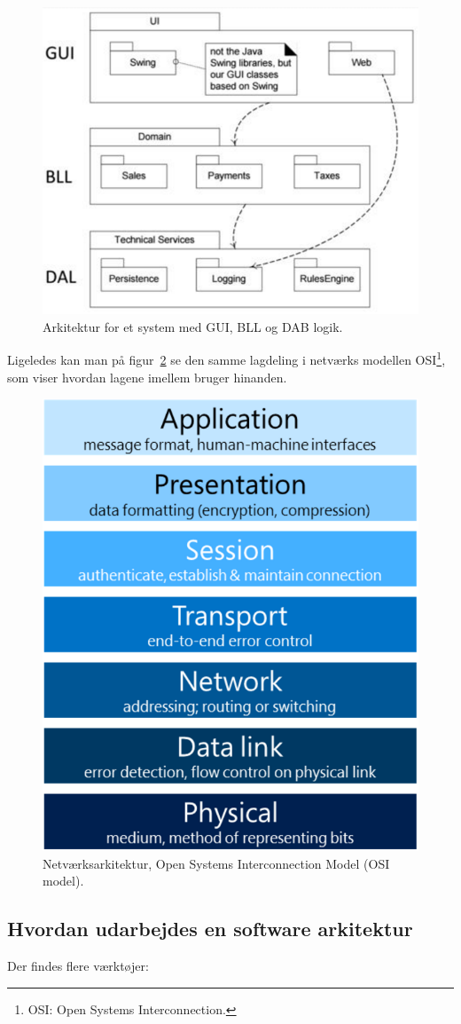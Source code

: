 \begin{figure}[h]
	\centering
	\includegraphics[width=0.7\linewidth]{figs/guiblldal}
	\caption{Arkitektur for et system med GUI, BLL og DAB logik.}
	\label{fig:guiblldab}
\end{figure}

Ligeledes kan man på figur~\ref{fig:osimodel} se den samme lagdeling i netværks modellen OSI\footnote{OSI: Open Systems Interconnection.}, som viser hvordan lagene imellem bruger hinanden.

\begin{figure}[h]
	\centering
	\includegraphics[width=0.5\linewidth]{figs/osimodel}
	\caption{Netværksarkitektur, Open Systems Interconnection Model (OSI model).}
	\label{fig:osimodel}
\end{figure}

\subsection{Hvordan udarbejdes en software arkitektur}
Der findes flere værktøjer:

